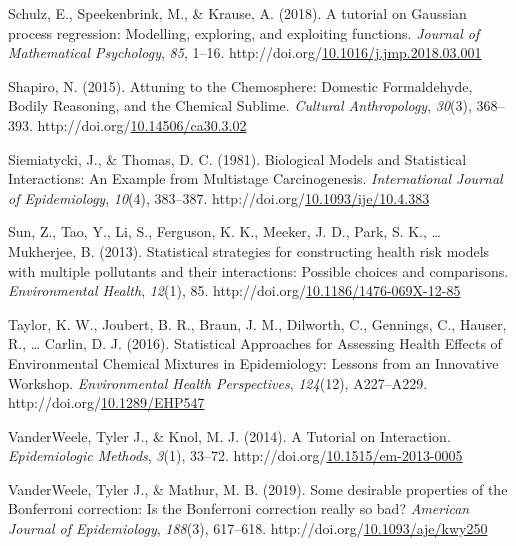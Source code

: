 \documentclass[12pt, twoside]{amherstthesis}
\newenvironment{CSLReferences}[2]%
  {}%
  {\par}
\begin{document}
\begin{CSLReferences}{1}{0}
\leavevmode{}%
Schulz, E., Speekenbrink, M., \& Krause, A. (2018). A tutorial on {Gaussian} process regression: {Modelling}, exploring, and exploiting functions. \emph{Journal of Mathematical Psychology}, \emph{85}, 1--16. http://doi.org/\href{https://doi.org/10.1016/j.jmp.2018.03.001}{10.1016/j.jmp.2018.03.001}

\leavevmode{}%
Shapiro, N. (2015). Attuning to the {Chemosphere}: {Domestic} {Formaldehyde}, {Bodily} {Reasoning}, and the {Chemical} {Sublime}. \emph{Cultural Anthropology}, \emph{30}(3), 368--393. http://doi.org/\href{https://doi.org/10.14506/ca30.3.02}{10.14506/ca30.3.02}

\leavevmode{}%
Siemiatycki, J., \& Thomas, D. C. (1981). Biological {Models} and {Statistical} {Interactions}: An {Example} from {Multistage} {Carcinogenesis}. \emph{International Journal of Epidemiology}, \emph{10}(4), 383--387. http://doi.org/\href{https://doi.org/10.1093/ije/10.4.383}{10.1093/ije/10.4.383}

\leavevmode{}%
Sun, Z., Tao, Y., Li, S., Ferguson, K. K., Meeker, J. D., Park, S. K., \ldots{} Mukherjee, B. (2013). Statistical strategies for constructing health risk models with multiple pollutants and their interactions: Possible choices and comparisons. \emph{Environmental Health}, \emph{12}(1), 85. http://doi.org/\href{https://doi.org/10.1186/1476-069X-12-85}{10.1186/1476-069X-12-85}

\leavevmode{}%
Taylor, K. W., Joubert, B. R., Braun, J. M., Dilworth, C., Gennings, C., Hauser, R., \ldots{} Carlin, D. J. (2016). Statistical {Approaches} for {Assessing} {Health} {Effects} of {Environmental} {Chemical} {Mixtures} in {Epidemiology}: {Lessons} from an {Innovative} {Workshop}. \emph{Environmental Health Perspectives}, \emph{124}(12), A227--A229. http://doi.org/\href{https://doi.org/10.1289/EHP547}{10.1289/EHP547}

\leavevmode{}%
VanderWeele, Tyler J., \& Knol, M. J. (2014). A {Tutorial} on {Interaction}. \emph{Epidemiologic Methods}, \emph{3}(1), 33--72. http://doi.org/\href{https://doi.org/10.1515/em-2013-0005}{10.1515/em-2013-0005}

\leavevmode{}%
VanderWeele, Tyler J., \& Mathur, M. B. (2019). Some desirable properties of the {Bonferroni} correction: {Is} the {Bonferroni} correction really so bad? \emph{American Journal of Epidemiology}, \emph{188}(3), 617--618. http://doi.org/\href{https://doi.org/10.1093/aje/kwy250}{10.1093/aje/kwy250}


\end{CSLReferences}
\end{document}
